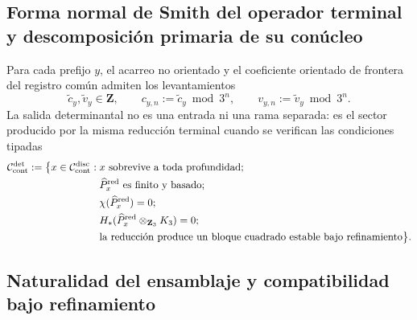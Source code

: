 \subsection{Forma normal de Smith del operador terminal y descomposición primaria de su conúcleo}
Para cada prefijo \(y\), el acarreo no orientado y el coeficiente orientado
de frontera del registro común admiten los levantamientos
\begin{equation}
\label{eq:detint-c-v-lifts}
 \widetilde c_y,\widetilde v_y\in\mathbf Z,\qquad
 c_{y,n}:=\widetilde c_y\bmod3^n,\qquad
 v_{y,n}:=\widetilde v_y\bmod3^n.
\end{equation}
La salida determinantal no es una entrada ni una rama separada: es el sector
producido por la misma reducción terminal cuando se verifican las condiciones
tipadas
\begin{equation}
\label{eq:detint-dominio}
\begin{split}
 \mathcal C_{\rm cont}^{\rm det}:=\bigl\{x\in\mathcal C_{\rm cont}^{\rm disc}:{}&
 x\text{ sobrevive a toda profundidad};\\
 &\widehat P_x^{\rm red}\text{ es finito y basado};\\
 &\chi(\widehat P_x^{\rm red})=0;\\
 &H_*(\widehat P_x^{\rm red}\otimes_{\mathbf Z_3}K_3)=0;\\
 &\text{la reducción produce un bloque cuadrado estable bajo refinamiento}
 \bigr\}.
\end{split}
\end{equation}
\begingroup
  \let\section\subsection
  
\endgroup

\section{Naturalidad del ensamblaje y compatibilidad bajo refinamiento}

